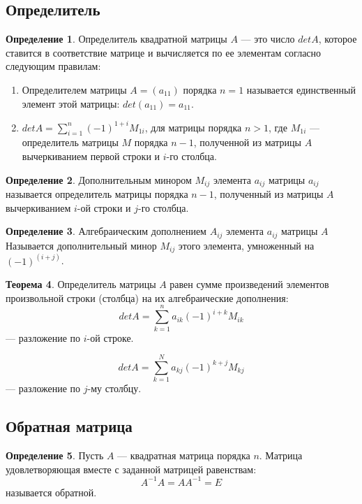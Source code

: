 \documentclass[12pt]{report}
\theoremstyle{definition}
\newtheorem{theorem}{Теорема}[chapter]
\newtheorem{definition}[theorem]{Определение}
\begin{document}
\subsection{Определитель}
\begin{definition}
Определитель квадратной матрицы $A$ --- это число $det A$, которое ставится в соответствие
матрице и вычисляется по ее элементам согласно следующим правилам:
\begin{enumerate}
\item Определителем матрицы $A = (a_{11})$ порядка $n = 1$ называется
  единственный элемент этой матрицы: $det (a_{11}) = a_{11}$.
\item $det A = \sum\limits_{i = 1}^n (-1)^{1+i} M_{1i}$, для матрицы порядка $n > 1$,
  где $M_{1i}$ --- определитель матрицы $M$ порядка $n - 1$, полученной из матрицы $A$ вычеркиванием
  первой строки и $i$-го столбца.
\end{enumerate}
\end{definition}

\begin{definition}
Дополнительным минором $M_{ij}$ элемента $a_{ij}$ матрицы $a_{ij}$
называется определитель матрицы порядка $n-1$, полученный из матрицы
$A$ вычеркиванием $i$-ой строки и $j$-го столбца.
\end{definition}

\begin{definition}
Алгебраическим дополнением $A_{ij}$ элемента $a_{ij}$ матрицы $A$
Называется дополнительный минор $M_{ij}$ этого элемента,
умноженный на $(-1)^{(i+j)}$.
\end{definition}

\begin{theorem}
Определитель матрицы $A$ равен сумме произведений
элементов произвольной строки (столбца) на их алгебраические дополнения:
$$
det A = \sum\limits_{k = 1}^n a_{ik} (-1)^{i+k} M_{ik}
$$ --- разложение по $i$-ой строке.

$$
det A = \sum\limits_{k = 1}^N a_{kj} (-1)^{k + j} M_{kj}
$$ --- разложение по $j$-му столбцу.
\end{theorem}

\subsection{Обратная матрица}
\begin{definition}
Пусть $A$ --- квадратная матрица порядка $n$. Матрица удовлетворяющая
вместе с заданной матрицей равенствам:
$$
A^{-1} A = A A^{-1} = E
$$
называется обратной.
\end{definition}
\end{document}
